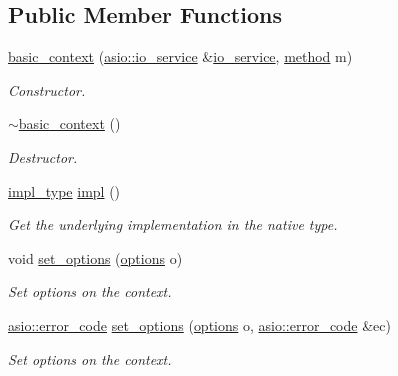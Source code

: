 \subsection*{Public Member Functions}
\begin{DoxyCompactItemize}
\item 
\hyperlink{classasio_1_1ssl_1_1old_1_1basic__context_a9e68bd4adbed02486d36846b1f7884ea}{basic\+\_\+context} (\hyperlink{classasio_1_1io__service}{asio\+::io\+\_\+service} \&\hyperlink{classasio_1_1io__service}{io\+\_\+service}, \hyperlink{classasio_1_1ssl_1_1context__base_ac37d498266e3b13607f011ace6417525}{method} m)
\begin{DoxyCompactList}\small\item\em Constructor. \end{DoxyCompactList}\item 
\hyperlink{classasio_1_1ssl_1_1old_1_1basic__context_ab4cb84b3b0a110ea034584c64d2fc40a}{$\sim$basic\+\_\+context} ()
\begin{DoxyCompactList}\small\item\em Destructor. \end{DoxyCompactList}\item 
\hyperlink{classasio_1_1ssl_1_1old_1_1basic__context_a0ab28e5a1f4db7dbf190e6bb8931031a}{impl\+\_\+type} \hyperlink{classasio_1_1ssl_1_1old_1_1basic__context_a2c5a23f2187a45c7250f7b9fc6c6da5f}{impl} ()
\begin{DoxyCompactList}\small\item\em Get the underlying implementation in the native type. \end{DoxyCompactList}\item 
void \hyperlink{classasio_1_1ssl_1_1old_1_1basic__context_a450fd71b35addd8b5d445cce85485c66}{set\+\_\+options} (\hyperlink{classasio_1_1ssl_1_1context__base_a12d5d28abeb47c91311bf13740dec514}{options} o)
\begin{DoxyCompactList}\small\item\em Set options on the context. \end{DoxyCompactList}\item 
\hyperlink{classasio_1_1error__code}{asio\+::error\+\_\+code} \hyperlink{classasio_1_1ssl_1_1old_1_1basic__context_ab337a0a558db0823301a22dc166ec463}{set\+\_\+options} (\hyperlink{classasio_1_1ssl_1_1context__base_a12d5d28abeb47c91311bf13740dec514}{options} o, \hyperlink{classasio_1_1error__code}{asio\+::error\+\_\+code} \&ec)
\begin{DoxyCompactList}\small\item\em Set options on the context. \end{DoxyCompactList}\item 

\end{DoxyCompactItemize}
